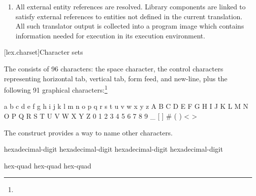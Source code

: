 \documentclass{wg21}
\begin{document}
\begin{enumerate}
    \item All external entity references are resolved. Library
    components are linked to satisfy external references to
    entities not defined in the current translation. All such translator
    output is collected into a program image which contains information
    needed for execution in its execution environment.%
\end{enumerate}

[lex.charset]{Character sets}

\pnum
{}%

\begin{removedblock}
The  consists of 96 characters: the space character,
the control characters representing horizontal tab, vertical tab, form feed, and
new-line, plus the following 91 graphical characters:\footnote{}
\begin{codeblock}
    a b c d e f g h i j k l m n o p q r s t u v w x y z
    A B C D E F G H I J K L M N O P Q R S T U V W X Y Z
    0 1 2 3 4 5 6 7 8 9
    _ { } [ ] # ( ) < > %
\end{codeblock}

\end{removedblock}

\pnum
The  construct provides a way to name
other characters.

\begin{bnf}
    \br
    hexadecimal-digit hexadecimal-digit hexadecimal-digit hexadecimal-digit
\end{bnf}

\begin{bnf}
    \br
     hex-quad\br
     hex-quad hex-quad
\end{bnf}
\end{document}
